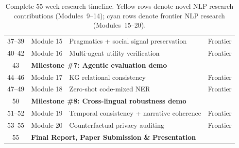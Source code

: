 \documentclass[11pt, a4paper]{article}
\begin{document}
\begin{table}[H]
\begin{tabular}{cllc}
\midrule
\rowcolor{cyan!8}
37--39 & Module 15 & Pragmatics + social signal preservation & Frontier \\
\rowcolor{cyan!8}
40--42 & Module 16 & Multi-agent utility verification & Frontier \\
43 & \multicolumn{2}{l}{\textbf{Milestone \#7: Agentic evaluation demo}} & \\
\midrule
\rowcolor{cyan!8}
44--46 & Module 17 & KG relational consistency & Frontier \\
\rowcolor{cyan!8}
47--49 & Module 18 & Zero-shot code-mixed NER & Frontier \\
50 & \multicolumn{2}{l}{\textbf{Milestone \#8: Cross-lingual robustness demo}} & \\
\midrule
\rowcolor{cyan!8}
51--52 & Module 19 & Temporal consistency + narrative coherence & Frontier \\
\rowcolor{cyan!8}
53--55 & Module 20 & Counterfactual privacy auditing & Frontier \\
55 & \multicolumn{2}{l}{\textbf{Final Report, Paper Submission \& Presentation}} & \\
\bottomrule
\end{tabular}
\caption{Complete 55-week research timeline. Yellow rows denote novel NLP research contributions (Modules~9--14); cyan rows denote frontier NLP research (Modules~15--20).}
\end{table}
\end{document}
